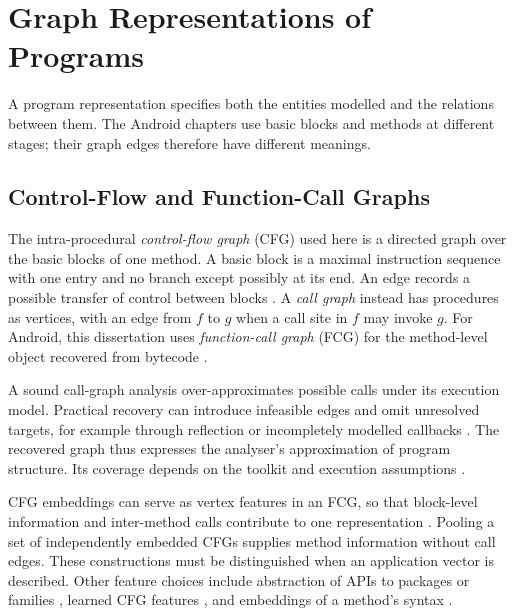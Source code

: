 \section{Graph Representations of Programs}
\label{sec:background:graphs}

A program representation specifies both the entities modelled and the relations between them.
The Android chapters use basic blocks and methods at different stages; their graph edges
therefore have different meanings.

\subsection{Control-Flow and Function-Call Graphs}
\label{sec:background:graphs:pairwise}

The intra-procedural \emph{control-flow graph} (CFG) used here is a directed graph over the
basic blocks of one method. A basic block is a maximal instruction sequence with one entry
and no branch except possibly at its end. An edge records a possible transfer of control
between blocks \cite{bilot2024survey}. A \emph{call graph} instead has procedures as vertices,
with an edge from $f$ to $g$ when a call site in $f$ may invoke $g$. For Android, this
dissertation uses \emph{function-call graph} (FCG) for the method-level object recovered from
bytecode \cite{gascon2013structural,norouzian2025hgannmal}.

A sound call-graph analysis over-approximates possible calls under its execution model.
Practical recovery can introduce infeasible edges and omit unresolved targets, for example
through reflection or incompletely modelled callbacks \cite{arzt2014flowdroid}.
The recovered graph thus expresses the analyser's approximation of program structure.
Its coverage depends on the toolkit and execution assumptions
\cite{desnos2012android,valleerai2010soot}.

CFG embeddings can serve as vertex features in an FCG, so that block-level information and
inter-method calls contribute to one representation \cite{bilot2024survey}. Pooling a set of
independently embedded CFGs supplies method information without call edges. These constructions
must be distinguished when an application vector is described. Other feature choices include
abstraction of APIs to packages or families \cite{onwuzurike2019mamadroid}, learned CFG
features \cite{dai2016discriminative,xu2017neural}, and embeddings of a method's syntax
\cite{alon2019code2vec}.

